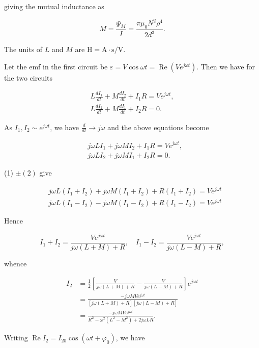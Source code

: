 \documentclass[10pt]{article}
\begin{document}
giving the mutual inductance as

$$
M=\frac{\Psi_{M}}{I}=\frac{\pi \mu_{0} N^{2} \rho^{4}}{2 d^{3}} .
$$

The units of $L$ and $M$ are $\mathrm{H}=\mathrm{A} \cdot \mathrm{s} / \mathrm{V}$.

 Let the emf in the first circuit be $\varepsilon=V \cos \omega t=\operatorname{Re}\left(V e^{j \omega t}\right)$. Then we have for the two circuits

$$
\begin{gathered}
L \frac{d I_{1}}{d t}+M \frac{d I_{2}}{d t}+I_{1} R=V e^{j \omega t}, \\
L \frac{d I_{2}}{d t}+M \frac{d I_{1}}{d t}+I_{2} R=0 .
\end{gathered}
$$

As $I_{1}, I_{2} \sim e^{j \omega t}$, we have $\frac{d}{d t} \rightarrow j \omega$ and the above equations become

$$
\begin{aligned}
&j \omega L I_{1}+j \omega M I_{2}+I_{1} R=V e^{j \omega t}, \\
&j \omega L I_{2}+j \omega M I_{1}+I_{2} R=0 .
\end{aligned}
$$

(1) $\pm(2)$ give

$$
\begin{aligned}
&j \omega L\left(I_{1}+I_{2}\right)+j \omega M\left(I_{1}+I_{2}\right)+R\left(I_{1}+I_{2}\right)=V e^{j \omega t} \\
&j \omega L\left(I_{1}-I_{2}\right)-j \omega M\left(I_{1}-I_{2}\right)+R\left(I_{1}-I_{2}\right)=V e^{j \omega t}
\end{aligned}
$$

Hence

$$
I_{1}+I_{2}=\frac{V e^{j \omega t}}{j \omega(L+M)+R}, \quad I_{1}-I_{2}=\frac{V e^{j \omega t}}{j \omega(L-M)+R},
$$

whence

$$
\begin{aligned}
I_{2} &=\frac{1}{2}\left[\frac{V}{j \omega(L+M)+R}-\frac{V}{j \omega(L-M)+R}\right] e^{j \omega t} \\
&=\frac{-j \omega M V e^{j \omega t}}{[j \omega(L+M)+R][j \omega(L-M)+R]} \\
&=\frac{-j \omega M V e^{j \omega t}}{R^{2}-\omega^{2}\left(L^{2}-M^{2}\right)+2 j \omega L R} .
\end{aligned}
$$

Writing $\operatorname{Re} I_{2}=I_{20} \cos \left(\omega t+\varphi_{0}\right)$, we have
\end{document}
